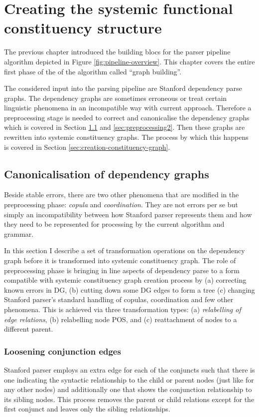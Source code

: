 \chapter{Creating the systemic functional constituency structure}
\label{ch:parsing-algorithm}

The previous chapter introduced the building blocs for the parser pipeline algorithm depicted in Figure \ref{fig:pipeline-overview}. This chapter covers the entire first phase of the of the algorithm called ``graph building''. 

The considered input into the parsing pipeline are Stanford dependency parse graphs. The dependency graphs are sometimes erroneous or treat certain linguistic phenomena in an incompatible way with current approach. Therefore a preprocessing stage is needed to correct and canonicalise the dependency graphs which is covered in Section \ref{sec:preprocessing1} and \ref{sec:preprocessing2}. Then these graphs are rewritten into systemic constituency graphs. The process by which this happens is covered in Section \ref{sec:creation-constituency-graph}.

\section{Canonicalisation of dependency graphs}
\label{sec:preprocessing1}
Beside stable errors, there are two other phenomena that are modified in the preprocessing phase: \textit{copula} and \textit{coordination}. They are not errors per se but simply an incompatibility between how Stanford parser represents them and how they need to be represented for processing by the current algorithm and grammar.

In this section I describe a set of transformation operations on the dependency graph before it is transformed into systemic constituency graph. The role of preprocessing phase is bringing in line aspects of dependency parse to a form compatible with systemic constituency graph creation process by (a) correcting known errors in DG, (b) cutting down some DG edges to form a tree (c) changing Stanford parser's standard handling of copulas, coordination and few other phenomena. This is achieved via three transformation types: (a) \textit{relabelling of edge relations}, (b) relabelling node POS, and (c) reattachment of nodes to a different parent. 

\subsection{Loosening conjunction edges}
Stanford parser employs an extra edge for each of the conjuncts such that there is one indicating the syntactic relationship to the child or parent nodes (just like for any other nodes) and additionally one that shows the conjunction relationship to its sibling nodes. This process removes the parent or child relations except for the first conjunct and leaves only the sibling relationships. 

